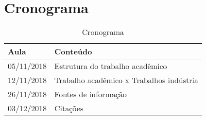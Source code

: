 \section{Cronograma}

\begin{frame}{}
	\begin{table}[]
		\begin{tabular}{|l|l|}
		\hline
		\textbf{Aula} & \textbf{Conteúdo}  \\ \hline
		 05/11/2018 & Estrutura do trabalho acadêmico \\ \hline	
		 12/11/2018  & Trabalho acadêmico x Trabalhos indústria  \\ \hline	
		 26/11/2018 & Fontes de informação  \\ \hline	
		 03/12/2018 & Citações \\ \hline 		 		 
		\end{tabular}
		\caption{Cronograma}
	\end{table}
\end{frame}
